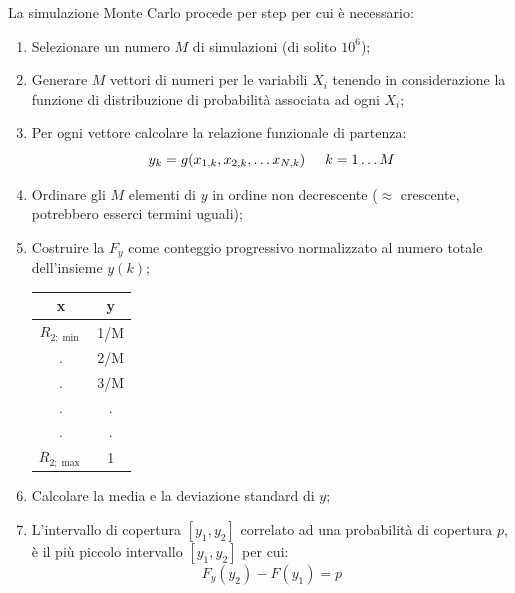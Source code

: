 \documentclass[a4paper, 15pt]{article}
\begin{document}
\begin{adjustwidth}{2in}{}
  	 		La simulazione Monte Carlo procede per step per cui è necessario:
  	 		\begin{enumerate}
  	 			\item Selezionare un numero $ M $ di simulazioni (di solito $ 10^6 $);
  	 			\item Generare $ M $ vettori di numeri per le variabili $ X_i $ tenendo in considerazione la funzione
  	 			di distribuzione di probabilità associata ad ogni $ X_i $;
  	 			\item Per ogni vettore calcolare la relazione funzionale di partenza:
  	 			\[y_k = g(x_{1,k}, x_{2,k},\dots x_{N,k})\hspace{0.5cm} k=1\dots M \] 
  	 			\item Ordinare gli $ M $ elementi di $ y $ in ordine non decrescente ($\approx$ crescente, potrebbero esserci termini uguali);
  	 			\item Costruire la $ F_y $ come conteggio progressivo normalizzato al numero totale
  	 			dell’insieme $ y(k) $; \newline
  	 			\begin{table}[H]
  	 				\centering
  	 				\begin{tabular}{|c|c|}
  	 				\hline
  	 				x & y \\
  	 				\hline
  	 				$ R_{2;\min} $ & 1/M \\
  	 				\hline
  	 				. & 2/M \\
  	 				\hline
  	 				. & 3/M \\
  	 				\hline
  	 				. & .\\
  	 				\hline
  	 				. & . \\
  	 				\hline
  	 				$ R_{2;\max} $ & 1 \\
  	 				\hline
  	 			\end{tabular}
  	 			\end{table}
  	 			\item Calcolare la media e la deviazione standard di $ y $;
  	 			\item L’intervallo di copertura $ [y_1, y_2] $ correlato ad una probabilità di copertura $ p $, è il più
  	 			piccolo intervallo $ [y_1, y_2] $ per cui:
  	 			\[F_y(y_2) - F(y_1) = p\]
  	 		\end{enumerate}
\end{adjustwidth}
\newpage
\end{document}
